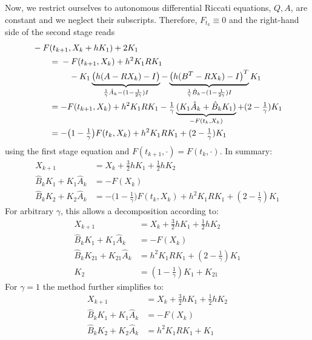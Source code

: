 Now, we restrict ourselves to autonomous differential Riccati equations,
\ie $Q, A$, \etc are constant and we neglect their subscripts.
Therefore, $F_{t_k}\equiv 0$ and the right-hand side of the second stage reads
\begin{subequations}\label{eq:mena:stage2:rhs:autonomous}
\begin{align}
  \MoveEqLeft
  -F(t_{k+1}, X_k + hK_1) + 2K_1
  \nonumber \\
  &= \begin{multlined}[t]
    -F(t_{k+1}, X_k) + h^2 K_1 R K_1 \\
    - K_1
    \underbrace{
      \big(h(A - R X_k) - I\big)
    }_{\frac{1}{\gamma} \hat{A}_k - (1-\frac{1}{2\gamma}) I}
    - \underbrace{
      \big(h(B^T - R X_k) - I\big)^T
    }_{\frac{1}{\gamma} \hat{B}_k - (1-\frac{1}{2\gamma}) I}
    K_1
  \end{multlined} \\
  &=
  -F(t_{k+1}, X_k) + h^2 K_1 R K_1
  -\tfrac{1}{\gamma}
  \underbrace{
    (K_1 \hat{A}_k + \hat{B}_k K_1)
  }_{-F(t_k,X_k)}
  + (2-\tfrac{1}{\gamma}) K_1 \\
  &= -\big(1-\tfrac{1}{\gamma}\big) F(t_k, X_k)
  + h^2 K_1 R K_1
  + (2-\tfrac{1}{\gamma}) K_1
\end{align}
\end{subequations}
using the first stage equation and $F(t_{k+1}, \cdot) = F(t_k,\cdot)$.
In summary:
\begin{subequations}
\begin{align}
  X_{k+1} &= X_k + \tfrac{3}{2} h K_1 + \tfrac{1}{2} h K_2 \\
  \hat{B}_k K_1 + K_1 \hat{A}_k &= -F(X_k) \\
  \hat{B}_k K_2 + K_2 \hat{A}_k &=
  -\big(1-\tfrac{1}{\gamma}\big) F(t_k, X_k)
  + h^2 K_1 R K_1
  + (2-\tfrac{1}{\gamma}) K_1
\end{align}
\end{subequations}
For arbitrary $\gamma$, this allows a decomposition according to:
\begin{subequations}\label{eq:mena:stages:autonomous}
\begin{align}
  \label{eq:mena:autonomous update}
  X_{k+1} &= X_k + \tfrac{3}{2} h K_1 + \tfrac{1}{2} h K_2 \\
  \hat{B}_k K_1 + K_1 \hat{A}_k &= -F(X_k) \\
  \label{eq:mena:autonomous K21}
  \hat{B}_k K_{21} + K_{21} \hat{A}_k &= h^2 K_1RK_1 + (2-\tfrac{1}{\gamma}) K_1 \\
  \label{eq:mena:autonomous K2}
  K_2 &= (1-\tfrac{1}{\gamma}) K_1 + K_{21}
\end{align}
\end{subequations}
For $\gamma=1$ the method further simplifies to:
\begin{subequations}\label{eq:mena:stages:gamma=1}
\begin{align}
  X_{k+1} &= X_k + \tfrac{3}{2} h K_1 + \tfrac{1}{2} h K_2 \\
  \hat{B}_k K_1 + K_1 \hat{A}_k &= -F(X_k) \\
  \hat{B}_k K_2 + K_2 \hat{A}_k &= h^2 K_1RK_1 + K_1
  \label{eq:mena:err:linear}
\end{align}
\end{subequations}


